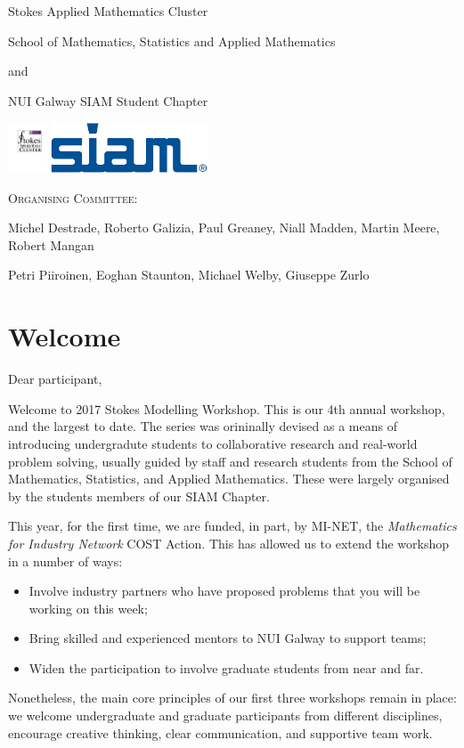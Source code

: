 \documentclass[a4paper, 11pt]{article}
\begin{document}
\vspace{60pt}
\centerline{\Large Stokes Applied Mathematics Cluster}
\centerline{\Large School of Mathematics, Statistics and Applied Mathematics}
\centerline{and}
\centerline{\Large NUI Galway SIAM Student Chapter}
\vspace{20pt}
\begin{center}
\includegraphics[height=1.5cm]{integral-stokes}
\hfill
\includegraphics[height=1.5cm]{SIAM}
\end{center}
\vspace{20pt}

\centerline{\textsc{Organising Committee:}}
\centerline{Michel Destrade, Roberto Galizia, Paul Greaney, Niall Madden, Martin Meere, Robert Mangan}
\centerline{Petri Piiroinen, Eoghan Staunton, Michael Welby, Giuseppe Zurlo}
\break

\pagestyle{plain}
\thispagestyle{plain}

\setcounter{page}{1}
\section*{Welcome}
Dear participant,

Welcome to 2017 Stokes Modelling Workshop. This is our 4th annual
workshop, and the largest to date. The series was orininally devised
as a means of introducing undergradute students to collaborative
research and real-world problem solving, usually guided by staff and
research students from the School of Mathematics, Statistics, and
Applied Mathematics. These were  largely organised by the students
members of our SIAM Chapter.

This year, for the first time, we are funded, in part, by 
MI-NET, the \emph{Mathematics for Industry    Network} COST Action.
This has allowed us to extend the workshop in a number of ways:
\begin{itemize}
\item Involve industry partners who have proposed problems that you
  will be working on this week;
\item Bring skilled and experienced mentors to NUI Galway to support
  teams;
\item Widen the participation to involve graduate students from near
  and far.
\end{itemize}
Nonetheless, the main core principles of our first three workshops
remain in place: we welcome undergraduate and graduate participants
from different disciplines,
encourage creative thinking, clear communication, and supportive team
work.
\end{document}
